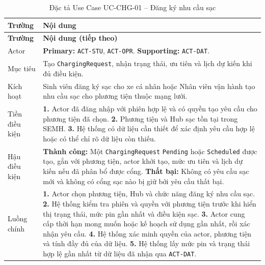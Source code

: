 \begin{longtable}{|L{26mm}|L{118mm}|}
  \caption{Đặc tả Use Case UC-CHG-01 -- Đăng ký nhu cầu sạc}\label{tab:spec-UC-CHG-01}\\
  \hline
  \centering\arraybackslash\textbf{Trường} & \centering\arraybackslash\textbf{Nội dung}\\
  \hline
  \endfirsthead
  \hline
  \centering\arraybackslash\textbf{Trường} & \centering\arraybackslash\textbf{Nội dung (tiếp theo)}\\
  \hline
  \endhead
  Actor & \textbf{Primary:} \texttt{ACT-STU}, \texttt{ACT-OPR}. \textbf{Supporting:} \texttt{ACT-DAT}.\\\hline
  Mục tiêu & Tạo \texttt{ChargingRequest}, nhận trạng thái, ưu tiên và lịch dự kiến khi đủ điều kiện.\\\hline
  Kích hoạt & Sinh viên đăng ký sạc cho xe cá nhân hoặc Nhân viên vận hành tạo nhu cầu sạc cho phương tiện thuộc mạng lưới.\\\hline
  Tiền điều kiện &
    \textbf{1.} Actor đã đăng nhập với phiên hợp lệ và có quyền tạo yêu cầu cho phương tiện đã chọn.\newline
    \textbf{2.} Phương tiện và Hub sạc tồn tại trong SEMH.\newline
    \textbf{3.} Hệ thống có dữ liệu cần thiết để xác định yêu cầu hợp lệ hoặc có thể chỉ rõ dữ liệu còn thiếu.\\\hline
  Hậu điều kiện &
    \textbf{Thành công:} Một \texttt{ChargingRequest} \texttt{Pending} hoặc \texttt{Scheduled} được tạo, gắn với phương tiện, actor khởi tạo, mức ưu tiên và lịch dự kiến nếu đã phân bổ được cổng.\newline
    \textbf{Thất bại:} Không có yêu cầu sạc mới và không có cổng sạc nào bị giữ bởi yêu cầu thất bại.\\\hline
  Luồng chính &
    \textbf{1.} Actor chọn phương tiện, Hub và chức năng đăng ký nhu cầu sạc.\newline
    \textbf{2.} Hệ thống kiểm tra phiên và quyền với phương tiện trước khi hiển thị trạng thái, mức pin gần nhất và điều kiện sạc.\newline
    \textbf{3.} Actor cung cấp thời hạn mong muốn hoặc kế hoạch sử dụng gần nhất, rồi xác nhận yêu cầu.\newline
    \textbf{4.} Hệ thống xác minh quyền của actor, phương tiện và tính đầy đủ của dữ liệu.\newline
    \textbf{5.} Hệ thống lấy mức pin và trạng thái hợp lệ gần nhất từ dữ liệu đã nhận qua \texttt{ACT-DAT}.\newline

\end{longtable}
